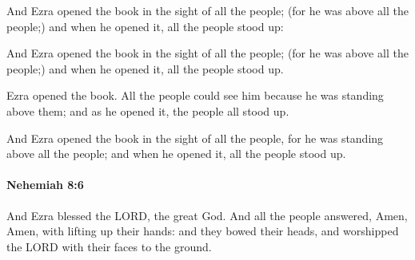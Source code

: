 			And Ezra opened the book in the sight of all the people; (for he was above all the people;) and when he opened it, all the people stood up:

			\begin{versebox}
					\item[BHS] 
					\item[LXX] 
					\item[ASV] And Ezra opened the book in the sight of all the people; (for he was above all the people;) and when he opened it, all the people stood up.
					\item[NIV] Ezra opened the book. All the people could see him because he was standing above them; and as he opened it, the people all stood up.
					\item[NRSV] And Ezra opened the book in the sight of all the people, for he was standing above all the people; and when he opened it, all the people stood up.
			\end{versebox}

		\paragraph{Nehemiah 8:6} %
			\label{NEHEMIAH-8-6}

			And Ezra blessed the LORD, the great God. And all the people answered, Amen, Amen, with lifting up their hands: and they bowed their heads, and worshipped the LORD with their faces to the ground.

